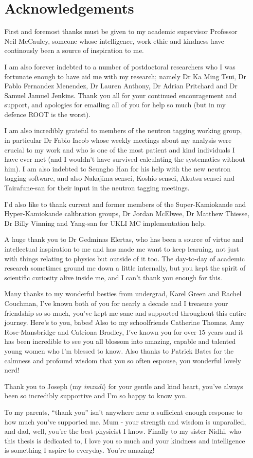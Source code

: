 \chapter*{Acknowledgements}
\thispagestyle{empty}
First and foremost thanks must be given to my academic supervisor Professor Neil McCauley, someone whose intelligence, work ethic and kindness have continously been a source of inspiration to me. 

I am also forever indebted to a number of postdoctoral researchers who I was fortunate enough to have aid me with my research; namely Dr Ka Ming Tsui, Dr Pablo Fernandez Menendez, Dr Lauren Anthony, Dr Adrian Pritchard and Dr Samuel Jamuel Jenkins. Thank you all for your continued encouragement and support, and apologies for emailing all of you for help so much (but in my defence ROOT is the worst).

I am also incredibly grateful to members of the neutron tagging working group, in particular Dr Fabio Iacob whose weekly meetings about my analysis were crucial to my work and who is one of the most patient and kind individuals I have ever met (and I wouldn't have survived calculating the systematics without him). I am also indebted to Seungho Han for his help with the new neutron tagging software, and also Nakajima-sensei, Koshio-sensei, Akutsu-sensei and Tairafune-san for their input in the neutron tagging meetings. 

I'd also like to thank current and former members of the Super-Kamiokande and Hyper-Kamiokande calibration groups, Dr Jordan McElwee, Dr Matthew Thiesse, Dr Billy Vinning and Yang-san for UKLI MC implementation help. 
 
A huge thank you to Dr Gedminas Elertas, who has been a source of virtue and intellectual inspiration to me and has made me want to keep learning, not just with things relating to physics but outside of it too. The day-to-day of academic research sometimes ground me down a little internally, but you kept the spirit of scientific curiosity alive inside me, and I can't thank you enough for this. 

Many thanks to my wonderful besties from undergrad, Karel Green and Rachel Couchman, I've known both of you for nearly a decade and I treasure your friendship so so much, you've kept me sane and supported throughout this entire journey. Here's to you, babes!
Also to my schoolfriends Catherine Thomas, Amy Rose-Mansbridge and Catriona Bradley, I've known you for over 15 years and it has been incredible to see you all blossom into amazing, capable and talented young women who I'm blessed to know. Also thanks to Patrick Bates for the calmness and profound wisdom that you so often espouse, you wonderful lovely nerd! 

Thank you to Joseph (my \textit{imzadi}) for your gentle and kind heart, you've always been so incredibly supportive and I'm so happy to know you.  

To my parents, ``thank you'' isn't anywhere near a sufficient enough response to how much you've supported me. Mum - your strength and wisdom is unparalled, and dad, well, you're the best physicist I know. Finally to my sister Nidhi, who this thesis is dedicated to, I love you so much and your kindness and intelligence is something I aspire to everyday. You're amazing! 
